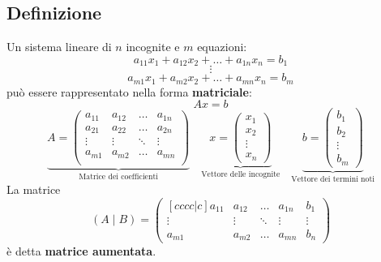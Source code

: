 \documentclass[a4paper]{article}
\theoremstyle{break}
\theoremstyle{break}
\theoremstyle{break}
\theoremstyle{break}
\begin{document}
\subsection{Definizione}
Un sistema lineare di \( n \) incognite e \( m \) equazioni:
\[
a_{11}x_1 + a_{12}x_2 + \ldots + a_{1n}x_n = b_1
\]
\[
\vdots
\]
\[
a_{m1}x_1 + a_{m2}x_2 + \ldots + a_{mn}x_n = b_m
\]
può essere rappresentato nella forma \textbf{matriciale}:
\[
Ax = b
\]
\[
\underbrace{
  A = \begin{pmatrix}
    a_{11} & a_{12} & \ldots & a_{1n} \\
    a_{21} & a_{22} & \ldots & a_{2n} \\
    \vdots & \vdots & \ddots & \vdots \\
    a_{m1} & a_{m2} & \ldots & a_{mn} \\
    \end{pmatrix}}_{\text{Matrice dei coefficienti}} \quad \underbrace{x = \begin{pmatrix}
    x_1    \\
    x_2    \\
    \vdots \\
    x_n
    \end{pmatrix}}_{\text{Vettore delle incognite}} \quad \underbrace{b = \begin{pmatrix}
    b_1    \\
    b_2    \\
    \vdots \\
    b_m
\end{pmatrix}}_{\text{Vettore dei termini noti}}
\]
La matrice \[ (A \;|\; B) = \begin{pmatrix}[cccc|c]
a_{11} & a_{12} & \ldots & a_{1n} & b_1    \\
\vdots & \vdots & \ddots & \vdots & \vdots \\
a_{m1} & a_{m2} & \ldots & a_{mn} & b_n
\end{pmatrix}  \] è detta \textbf{matrice aumentata}.
\end{document}
